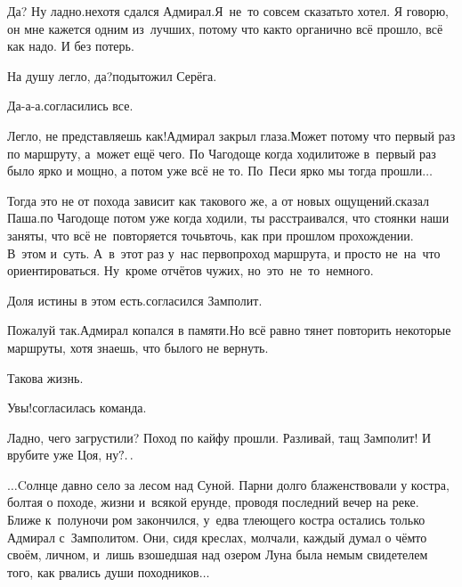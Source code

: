\diagdash Да? Ну ладно.\mdash нехотя сдался Адмирал.\mdash Я~не~то совсем сказать\sdash то хотел. Я говорю, он мне кажется одним из~лучших, потому что как\sdash то органично всё прошло, всё как надо. И без потерь.

\diagdash На душу легло, да?\mdash подытожил Серёга.

\diagdash Да-а-а.\mdash согласились все.

\diagdash Легло, не представляешь как!\mdash Адмирал закрыл глаза.\mdash Может потому что первый раз по маршруту, а~может ещё чего. По Чагодоще когда ходили\mdash тоже в~первый раз было ярко и мощно, а потом уже всё не то. По~Песи ярко мы тогда прошли$\ldots$

\diagdash Тогда это не от похода зависит как такового же, а от новых ощущений.\mdash сказал Паша.\mdash по Чагодоще потом уже когда ходили, ты расстраивался, что стоянки наши заняты, что всё не~повторяется точь\sdash в\sdash точь, как при прошлом прохождении. В~этом и~суть. А~в~этот раз у~нас первопроход маршрута, и просто не~на~что ориентироваться. Ну~кроме отчётов чужих, но~это~не~то~немного.

\diagdash Доля истины в этом есть.\mdash согласился Замполит.

\diagdash Пожалуй так.\mdash Адмирал копался в памяти.\mdash Но всё равно тянет повторить некоторые маршруты, хотя знаешь, что былого не вернуть.

\diagdash Такова жизнь.

\diagdash Увы!\mdash согласилась команда.

\diagdash Ладно, чего загрустили? Поход по кайфу прошли. Разливай, тащ Замполит! И врубите уже Цоя, ну$\mathpunct{?\ldotp\ldotp}$ %

\vspace{1em}
$\ldots$Cолнце давно село за лесом над Суной. Парни долго блаженствовали у костра, болтая о походе, жизни и~всякой ерунде, проводя последний вечер на реке. Ближе к~полуночи ром закончился, у~едва тлеющего костра остались только Адмирал с~Замполитом. Они, сидя креслах, молчали, каждый думал о чём\sdash то своём, личном, и~лишь взошедшая над озером Луна была немым свидетелем того, как рвались души походников$\ldots$


\begin{center}
\end{center}
